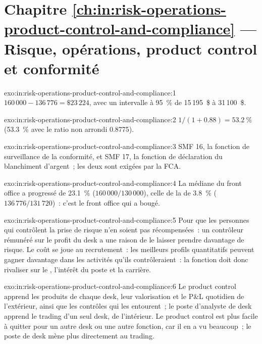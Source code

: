 \section*{Chapitre \ref{ch:in:risk-operations-product-control-and-compliance} --- Risque, opérations, product control et conformité}

\begin{solution}{exo:in:risk-operations-product-control-and-compliance:1}
$160\,000-136\,776=\$23\,224$, avec un intervalle à 95~\% de 15\,195~\$ à 31\,100~\$.
\end{solution}

\begin{solution}{exo:in:risk-operations-product-control-and-compliance:2}
$1/(1+0.88)=53.2~\%$ (53.3~\% avec le ratio non arrondi 0.8775).
\end{solution}

\begin{solution}{exo:in:risk-operations-product-control-and-compliance:3}
SMF 16, la fonction de surveillance de la conformité, et SMF 17, la fonction de déclaration du blanchiment d'argent~; les deux sont exigées par la
FCA.
\end{solution}

\begin{solution}{exo:in:risk-operations-product-control-and-compliance:4}
La médiane du front office a progressé de 23.1~\% ($160\,000/130\,000$), celle de la  de 3.8~\% ($136\,776/131\,720$)~: c'est le
front office qui a bougé.
\end{solution}

\begin{solution}{exo:in:risk-operations-product-control-and-compliance:5}
Pour que les personnes qui contrôlent la prise de risque n'en soient pas récompensées~: un contrôleur rémunéré sur le profit du desk a une raison de
le laisser prendre davantage de risque. Le coût se joue au recrutement~: les meilleurs profils quantitatifs peuvent gagner davantage dans les activités qu'ils
contrôleraient~: la fonction doit donc rivaliser sur le , l'intérêt du poste et la carrière.
\end{solution}

\begin{solution}{exo:in:risk-operations-product-control-and-compliance:6}
Le product control apprend les produits de chaque desk, leur valorisation et le P\&L quotidien de l'extérieur, ainsi que les contrôles qui les entourent~; le
poste d'analyste de desk apprend le trading d'un seul desk, de l'intérieur. Le product control est plus facile à quitter pour un autre desk ou
une autre fonction, car il en a vu beaucoup~; le poste de desk mène plus directement au trading.
\end{solution}

